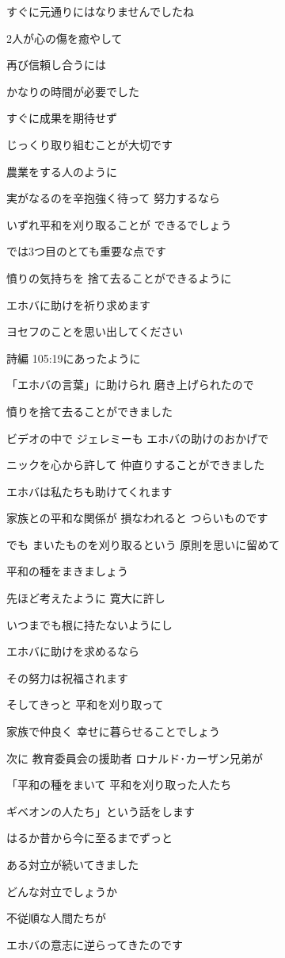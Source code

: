 \documentclass[twocolumn]{jsarticle}
\begin{document}
すぐに元通りにはなりませんでしたね

2人が心の傷を癒やして

再び信頼し合うには

かなりの時間が必要でした

すぐに成果を期待せず

じっくり取り組むことが大切です

農業をする人のように

実がなるのを辛抱強く待って
努力するなら

いずれ平和を刈り取ることが
できるでしょう

では3つ目のとても重要な点です

憤りの気持ちを
捨て去ることができるように

エホバに助けを祈り求めます

ヨセフのことを思い出してください

詩編 105:19にあったように

「エホバの言葉」に助けられ
磨き上げられたので

憤りを捨て去ることができました

ビデオの中で ジェレミーも
エホバの助けのおかげで

ニックを心から許して
仲直りすることができました

エホバは私たちも助けてくれます

家族との平和な関係が
損なわれると つらいものです

でも まいたものを刈り取るという
原則を思いに留めて

平和の種をまきましょう

先ほど考えたように 寛大に許し

いつまでも根に持たないようにし

エホバに助けを求めるなら

その努力は祝福されます

そしてきっと 平和を刈り取って

家族で仲良く
幸せに暮らせることでしょう

次に 教育委員会の援助者
ロナルド･カーザン兄弟が

「平和の種をまいて
平和を刈り取った人たち

ギベオンの人たち」という話をします

はるか昔から今に至るまでずっと

ある対立が続いてきました

どんな対立でしょうか

不従順な人間たちが

エホバの意志に逆らってきたのです
\end{document}
